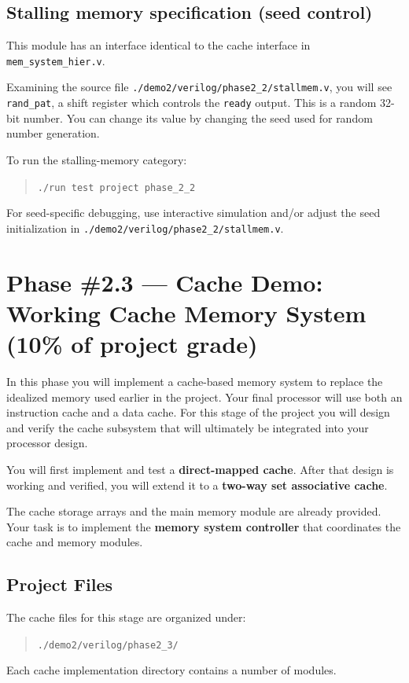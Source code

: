 \documentclass[12pt]{article}
\begin{document}
\subsection*{Stalling memory specification (seed control)}
This module has an interface identical to the cache interface in \texttt{mem\_system\_hier.v}.

Examining the source file \texttt{./demo2/verilog/phase2\_2/stallmem.v}, you will see \texttt{rand\_pat}, a shift register which controls the \texttt{ready} output.
This is a random 32-bit number.
You can change its value by changing the seed used for random number generation.

To run the stalling-memory category:
\begin{quote}
\texttt{./run test project phase\_2\_2}
\end{quote}
For seed-specific debugging, use interactive simulation and/or adjust the seed initialization in \texttt{./demo2/verilog/phase2\_2/stallmem.v}.

\section*{Phase \#2.3 --- Cache Demo: Working Cache Memory System (10\% of project grade)}

In this phase you will implement a cache-based memory system to replace the idealized memory used earlier in the project.
Your final processor will use both an instruction cache and a data cache. For this stage of the project you will design and
verify the cache subsystem that will ultimately be integrated into your processor design.

You will first implement and test a \textbf{direct-mapped cache}. After that design is working and verified, you will extend
it to a \textbf{two-way set associative cache}.

The cache storage arrays and the main memory module are already provided. Your task is to implement the
\textbf{memory system controller} that coordinates the cache and memory modules.

\subsection*{Project Files}

The cache files for this stage are organized under:
\begin{quote}
\texttt{./demo2/verilog/phase2\_3/}
\end{quote}
Each cache implementation directory contains a number of modules.
\end{document}

